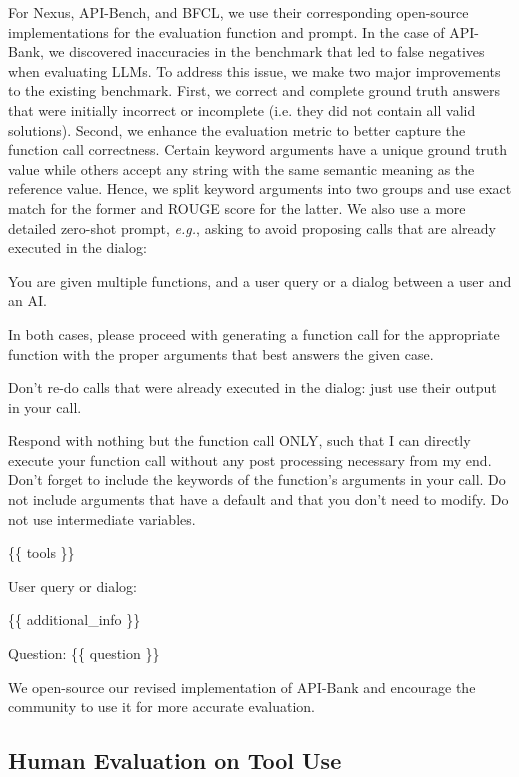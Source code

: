 For Nexus, API-Bench, and BFCL, we use their corresponding open-source implementations for the evaluation function and prompt. In the case of API-Bank, we discovered inaccuracies in the benchmark that led to false negatives when evaluating LLMs. To address this issue, we make two major improvements to the existing benchmark. First, we correct and complete ground truth answers that were initially incorrect or incomplete (i.e. they did not contain all valid solutions). Second, we enhance the evaluation metric to better capture the function call correctness. Certain keyword arguments have a unique ground truth value while others accept any string with the same semantic meaning as the reference value. Hence, we split keyword arguments into two groups and use exact match for the former and ROUGE score for the latter. We also use a more detailed zero-shot prompt, \textit{e.g.}, asking \llamathree to avoid proposing calls that are already executed in the dialog:
\begin{framed}
You are given multiple functions, and a user query or a dialog between a user and an AI.

        In both cases, please proceed with generating a function call for the appropriate function with the proper arguments that best answers the given case.

        Don't re-do calls that were already executed in the dialog: just use their output in your call.

        Respond with nothing but the function call ONLY, such that I can directly execute your function call without any post processing necessary from my end.
        Don't forget to include the keywords of the function's arguments in your call. Do not include arguments that have a default and that you don't need to modify.
        Do not use intermediate variables.

        \{\{ tools \}\}

        User query or dialog:

        \{\{ additional\_info \}\}

        Question: \{\{ question \}\}
\end{framed}

We open-source our revised implementation of API-Bank and encourage the community to use it for more accurate evaluation.


\subsection{Human Evaluation on Tool Use}
\label{appendix:tools_human_evals}

